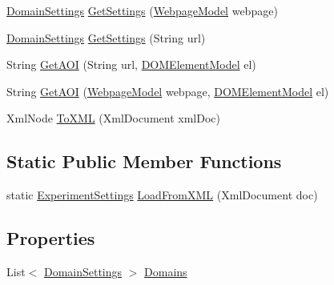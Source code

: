 \begin{DoxyCompactItemize}
\item 
\hyperlink{class_web_analyzer_1_1_models_1_1_settings_model_1_1_domain_settings}{Domain\+Settings} \hyperlink{class_web_analyzer_1_1_models_1_1_settings_model_1_1_experiment_settings_a8c574eb50eb580ad4bc990456215e6d0}{Get\+Settings} (\hyperlink{class_web_analyzer_1_1_models_1_1_data_model_1_1_webpage_model}{Webpage\+Model} webpage)
\item 
\hyperlink{class_web_analyzer_1_1_models_1_1_settings_model_1_1_domain_settings}{Domain\+Settings} \hyperlink{class_web_analyzer_1_1_models_1_1_settings_model_1_1_experiment_settings_a26caccee1fb4f572addc15c90e07feb4}{Get\+Settings} (String url)
\item 
String \hyperlink{class_web_analyzer_1_1_models_1_1_settings_model_1_1_experiment_settings_acd9206611b832449261d943a07397eb6}{Get\+A\+O\+I} (String url, \hyperlink{class_web_analyzer_1_1_models_1_1_data_model_1_1_d_o_m_element_model}{D\+O\+M\+Element\+Model} el)
\item 
String \hyperlink{class_web_analyzer_1_1_models_1_1_settings_model_1_1_experiment_settings_a239c206581d01cdda029a3e2dbc6c50b}{Get\+A\+O\+I} (\hyperlink{class_web_analyzer_1_1_models_1_1_data_model_1_1_webpage_model}{Webpage\+Model} webpage, \hyperlink{class_web_analyzer_1_1_models_1_1_data_model_1_1_d_o_m_element_model}{D\+O\+M\+Element\+Model} el)
\item 
Xml\+Node \hyperlink{class_web_analyzer_1_1_models_1_1_settings_model_1_1_experiment_settings_a3607aab81aaf98bd53880595cf2d1c78}{To\+X\+M\+L} (Xml\+Document xml\+Doc)
\end{DoxyCompactItemize}
\subsection*{Static Public Member Functions}
\begin{DoxyCompactItemize}
\item 
static \hyperlink{class_web_analyzer_1_1_models_1_1_settings_model_1_1_experiment_settings}{Experiment\+Settings} \hyperlink{class_web_analyzer_1_1_models_1_1_settings_model_1_1_experiment_settings_abed3a5d3b5034e8f8f466082645abedf}{Load\+From\+X\+M\+L} (Xml\+Document doc)
\end{DoxyCompactItemize}
\subsection*{Properties}
\begin{DoxyCompactItemize}
\item 
List$<$ \hyperlink{class_web_analyzer_1_1_models_1_1_settings_model_1_1_domain_settings}{Domain\+Settings} $>$ \hyperlink{class_web_analyzer_1_1_models_1_1_settings_model_1_1_experiment_settings_a3eb9dd2816871834368fe4dfd5a1b52e}{Domains}
\end{DoxyCompactItemize}

